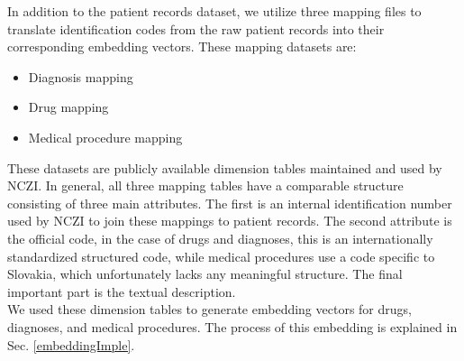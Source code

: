 In addition to the patient records dataset, we utilize three mapping files to translate identification codes from the raw patient records into their corresponding embedding vectors. These mapping datasets are:

\begin{itemize}
	\item Diagnosis mapping
	\item Drug mapping
	\item Medical procedure mapping
\end{itemize}

These datasets are publicly available dimension tables maintained and used by NCZI. In general, all three mapping tables have a comparable structure consisting of three main attributes. The first is an internal identification number used by NCZI to join these mappings to patient records. The second attribute is the official code, in the case of drugs and diagnoses, this is an internationally standardized structured code, while medical procedures use a code specific to Slovakia, which unfortunately lacks any meaningful structure. The final important part is the textual description.
\\

We used these dimension tables to generate embedding vectors for drugs, diagnoses, and medical procedures. The process of this embedding is explained in Sec. \ref{embeddingImple}.

